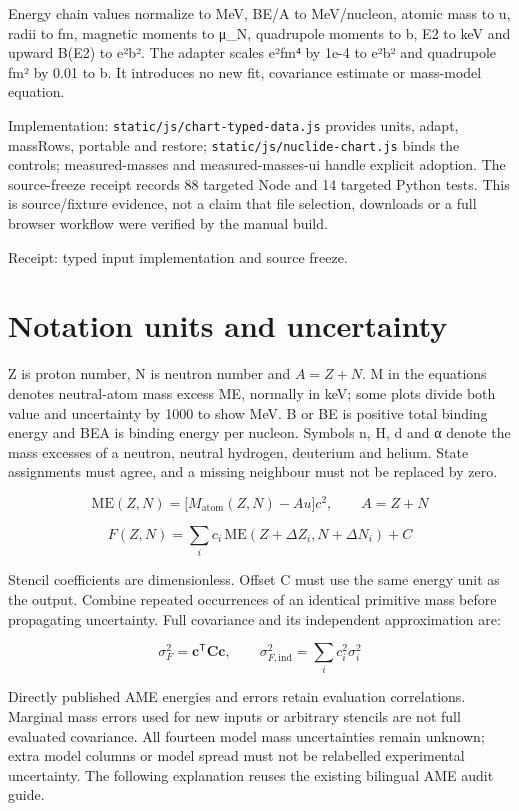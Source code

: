 \documentclass[
  11pt,
  letterpaper,
]{article}
\begin{document}
Energy chain values normalize to MeV, BE/A to MeV/nucleon, atomic mass
to u, radii to fm, magnetic moments to μ\_N, quadrupole moments to b, E2
to keV and upward B(E2) to e²b². The adapter scales e²fm⁴ by 1e-4 to
e²b² and quadrupole fm² by 0.01 to b. It introduces no new fit,
covariance estimate or mass-model equation.

Implementation: \texttt{static/js/chart-typed-data.js} provides units,
adapt, massRows, portable and restore;
\texttt{static/js/nuclide-chart.js} binds the controls; measured-masses
and measured-masses-ui handle explicit adoption. The source-freeze
receipt records 88 targeted Node and 14 targeted Python tests. This is
source/fixture evidence, not a claim that file selection, downloads or a
full browser workflow were verified by the manual build.

Receipt: typed input implementation and source freeze.

\section{Notation units and
uncertainty}\label{notation-units-and-uncertainty}

Z is proton number, N is neutron number and \(A=Z+N\). M in the
equations denotes neutral-atom mass excess ME, normally in keV; some
plots divide both value and uncertainty by 1000 to show MeV. B or BE is
positive total binding energy and BEA is binding energy per nucleon.
Symbols n, H, d and α denote the mass excesses of a neutron, neutral
hydrogen, deuterium and helium. State assignments must agree, and a
missing neighbour must not be replaced by zero.

\[
\mathrm{ME}(Z,N)=\bigl[M_{\mathrm{atom}}(Z,N)-Au\bigr]c^2,\qquad A=Z+N
\]

\[
F(Z,N)=\sum_i c_i\,\mathrm{ME}(Z+\Delta Z_i,N+\Delta N_i)+C
\]

Stencil coefficients are dimensionless. Offset C must use the same
energy unit as the output. Combine repeated occurrences of an identical
primitive mass before propagating uncertainty. Full covariance and its
independent approximation are:

\[
\sigma_F^2=\boldsymbol{c}^{\mathsf T}\mathbf C\boldsymbol{c},\qquad \sigma_{F,\mathrm{ind}}^2=\sum_i c_i^2\sigma_i^2
\]

Directly published AME energies and errors retain evaluation
correlations. Marginal mass errors used for new inputs or arbitrary
stencils are not full evaluated covariance. All fourteen model mass
uncertainties remain unknown; extra model columns or model spread must
not be relabelled experimental uncertainty. The following explanation
reuses the existing bilingual AME audit guide.
\end{document}
